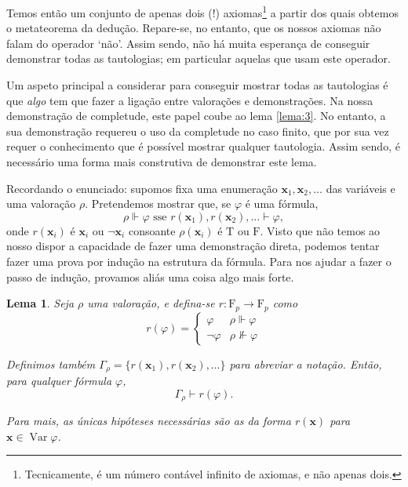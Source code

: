 \documentclass{report}
\newtheorem{lema}{Lema}
\theoremstyle{definition}
\theoremstyle{remark}
\renewcommand{\bf}[1]{\mathbf{#1}}
\newcommand{\F}{\mathrm{F}}
\newcommand{\lt}{\mathrm{T}}
\newcommand{\lf}{\mathrm{F}}
\DeclareMathOperator{\var}{Var}
\begin{document}
	Temos então um conjunto de apenas dois (!) axiomas\footnote{Tecnicamente, é um número contável infinito de axiomas, e não apenas dois.} a partir dos quais obtemos o metateorema da dedução. Repare-se, no entanto, que os nossos axiomas não falam do operador `não'. Assim sendo, não há muita esperança de conseguir demonstrar todas as tautologias; em particular aquelas que usam este operador.
	
	Um aspeto principal a considerar para conseguir mostrar todas as tautologias é que \emph{algo} tem que fazer a ligação entre valorações e demonstrações. Na nossa demonstração de completude, este papel coube ao lema \ref{lema:3}. No entanto, a sua demonstração requereu o uso da completude no caso finito, que por sua vez requer o conhecimento que é possível mostrar qualquer tautologia. Assim sendo, é necessário uma forma mais construtiva de demonstrar este lema.
	
	Recordando o enunciado: supomos fixa uma enumeração $\bf x_1, \bf x_2, \dots$ das variáveis e uma valoração $\rho$. Pretendemos mostrar que, se $\varphi$ é uma fórmula,
	\[\rho \Vdash \varphi \text{ sse } r(\bf x_1), r(\bf x_2), \dots \vdash \varphi,\]
	onde $r(\bf x_i)$ é $\bf x_i$ ou $\neg \bf x_i$ consoante $\rho(\bf x_i)$ é $\lt$ ou $\lf$. Visto que não temos ao nosso dispor a capacidade de fazer uma demonstração direta, podemos tentar fazer uma prova por indução na estrutura da fórmula. Para nos ajudar a fazer o passo de indução, provamos aliás uma coisa algo mais forte.
	
	\begin{lema}\label{ligacao:rho:vdash}
	Seja $\rho$ uma valoração, e defina-se $r : \F_p \to \F_p$ como 
	\[r(\varphi) =
	\begin{cases}
	\varphi&\rho\Vdash\varphi\\
	\neg\varphi&\rho\nVdash\varphi
	\end{cases}
	\]
	
	Definimos também $\Gamma_\rho = \{r(\bf x_1), r(\bf x_2), \dots\}$ para abreviar a notação. Então, para qualquer fórmula $\varphi$,
	\[\Gamma_\rho \vdash r(\varphi).\]
	
	Para mais, as únicas hipóteses necessárias são as da forma $r(\bf x)$ para $\bf x \in \var \varphi$.
	\end{lema}
	
\end{document}
